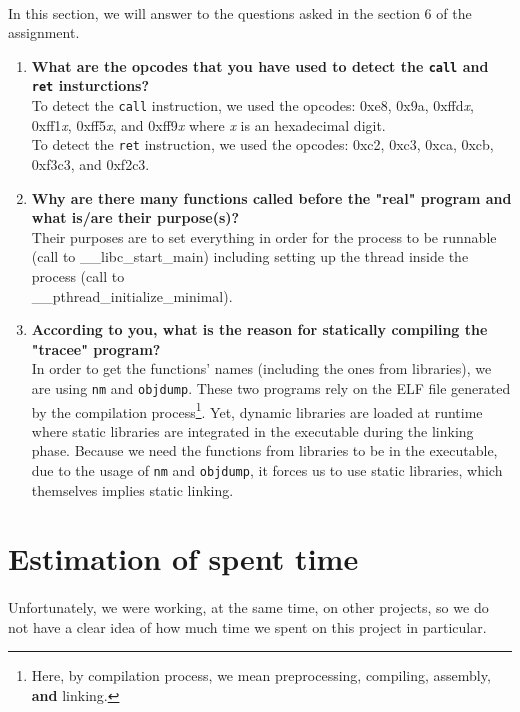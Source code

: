 \documentclass[a4paper, 11pt, oneside]{article}
\begin{document}
\paragraph{}In this section, we will answer to the questions asked in the section 6 of the assignment.
\begin{enumerate}
	\item \textbf{What are the opcodes that you have used to detect the \texttt{call} and \texttt{ret} insturctions?}\\
	To detect the \texttt{call} instruction, we used the opcodes: 0xe8, 0x9a, 0xffd\textit{x}, 0xff1\textit{x}, 0xff5\textit{x}, and 0xff9\textit{x} where \textit{x} is an hexadecimal digit.\\
	To detect the \texttt{ret} instruction, we used the opcodes: 0xc2, 0xc3, 0xca, 0xcb, 0xf3c3, and 0xf2c3.
	\item \textbf{Why are there many functions called before the "real" program and what is/are their purpose(s)?}\\
	Their purposes are to set everything in order for the process to be runnable (call to \_\_libc\_start\_main) including setting up the thread inside the process (call to\\\_\_pthread\_initialize\_minimal).
	\item \textbf{According to you, what is the reason for statically compiling the "tracee" program?}\\
	In order to get the functions' names (including the ones from libraries), we are using \texttt{nm} and \texttt{objdump}. These two programs rely on the ELF file generated by the compilation process\footnote{Here, by compilation process, we mean preprocessing, compiling, assembly, \textbf{and} linking.}. Yet, dynamic libraries are loaded at runtime where static libraries are integrated in the executable during the linking phase. Because we need the functions from libraries to be in the executable, due to the usage of \texttt{nm} and \texttt{objdump}, it forces us to use static libraries, which themselves implies static linking.
\end{enumerate}

\section{Estimation of spent time}
\paragraph{}Unfortunately, we were working, at the same time, on other projects, so we do not have a clear idea of how much time we spent on this project in particular.
\end{document}
